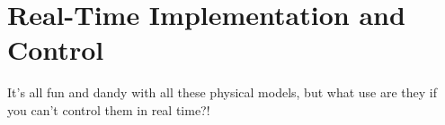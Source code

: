 \chapter*{Real-Time Implementation and Control}
It's all fun and dandy with all these physical models, but what use are they if you can't control them in real time?!